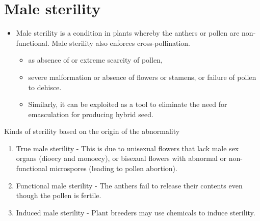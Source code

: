 \documentclass[11pt,ignorenonframetext,aspectratio=169]{beamer}
\providecommand{\tightlist}{%
  \setlength{\itemsep}{0pt}\setlength{\parskip}{0pt}}
\begin{document}
\hypertarget{male-sterility}{%
\section{Male sterility}\label{male-sterility}}

\begin{frame}{}
\protect\hypertarget{section-14}{}
\begin{itemize}
\tightlist
\item
  Male sterility is a condition in plants whereby the anthers or pollen
  are non-functional. Male sterility also enforces cross-pollination.

  \begin{itemize}
  \tightlist
  \item
    as absence of or extreme scarcity of pollen,
  \item
    severe malformation or absence of flowers or stamens, or failure of
    pollen to dehisce.
  \item
    Similarly, it can be exploited as a tool to eliminate the need for
    emasculation for producing hybrid seed.
  \end{itemize}
\end{itemize}
\end{frame}

\begin{frame}{Kinds of sterility based on the origin of the abnormality}
\protect\hypertarget{kinds-of-sterility-based-on-the-origin-of-the-abnormality}{}
\begin{enumerate}
\tightlist
\item
  True male sterility - This is due to unisexual flowers that lack male
  sex organs (dioecy and monoecy), or bisexual flowers with abnormal or
  non-functional microspores (leading to pollen abortion).
\item
  Functional male sterility - The anthers fail to release their contents
  even though the pollen is fertile.
\item
  Induced male sterility - Plant breeders may use chemicals to induce
  sterility.
\end{enumerate}
\end{frame}
\end{document}
